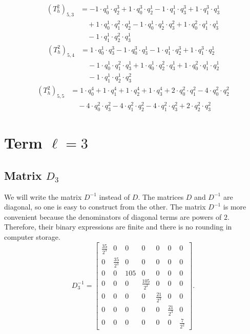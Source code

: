 \begin{align*}(T_{h}^2)_{5,3}&=-1\cdot q_0^{1}\cdot q_2^{3}+1\cdot q_0^{3}\cdot q_2^{1}-1\cdot q_1^{1}\cdot q_3^{3}+1\cdot q_1^{3}\cdot q_3^{1}\\
&\quad +1\cdot q_0^{1}\cdot q_1^{2}\cdot q_2^{1}-1\cdot q_0^{1}\cdot q_2^{1}\cdot q_3^{2}+1\cdot q_0^{2}\cdot q_1^{1}\cdot q_3^{1}\\
&\quad -1\cdot q_1^{1}\cdot q_2^{2}\cdot q_3^{1}\end{align*}
\begin{align*}(T_{h}^2)_{5,4}&=1\cdot q_0^{1}\cdot q_3^{3}-1\cdot q_0^{3}\cdot q_3^{1}-1\cdot q_1^{1}\cdot q_2^{3}+1\cdot q_1^{3}\cdot q_2^{1}\\
&\quad -1\cdot q_0^{1}\cdot q_1^{2}\cdot q_3^{1}+1\cdot q_0^{1}\cdot q_2^{2}\cdot q_3^{1}+1\cdot q_0^{2}\cdot q_1^{1}\cdot q_2^{1}\\
&\quad -1\cdot q_1^{1}\cdot q_2^{1}\cdot q_3^{2}\end{align*}
\begin{align*}(T_{h}^2)_{5,5}&=1\cdot q_0^{4}+1\cdot q_1^{4}+1\cdot q_2^{4}+1\cdot q_3^{4}+2\cdot q_0^{2}\cdot q_1^{2}-4\cdot q_0^{2}\cdot q_2^{2}\\
&\quad -4\cdot q_0^{2}\cdot q_3^{2}-4\cdot q_1^{2}\cdot q_2^{2}-4\cdot q_1^{2}\cdot q_3^{2}+2\cdot q_2^{2}\cdot q_3^{2}\end{align*}
\section{Term $\ell=3$}
\subsection{Matrix $D_3$}
We will write the matrix $D^{-1}$ instead of $D$. The matrices $D$ and $D^{-1}$ are diagonal, so one is easy to construct from the other. The matrix $D^{-1}$ is more convenient because the denominators of diagonal terms are powers of $2$. Therefore, their binary expressions are finite and there is no rounding in computer storage.\[D_3^{-1}=\left[\begin{array}{ccccccc}
\frac{35}{2^{3}} & 0 & 0 & 0 & 0 & 0 & 0\\
0 & \frac{35}{2^{3}} & 0 & 0 & 0 & 0 & 0\\
0 & 0 & 105 & 0 & 0 & 0 & 0\\
0 & 0 & 0 & \frac{105}{2^{2}} & 0 & 0 & 0\\
0 & 0 & 0 & 0 & \frac{21}{2^{3}} & 0 & 0\\
0 & 0 & 0 & 0 & 0 & \frac{21}{2^{3}} & 0\\
0 & 0 & 0 & 0 & 0 & 0 & \frac{7}{2^{2}}
\end{array}\right].\]
